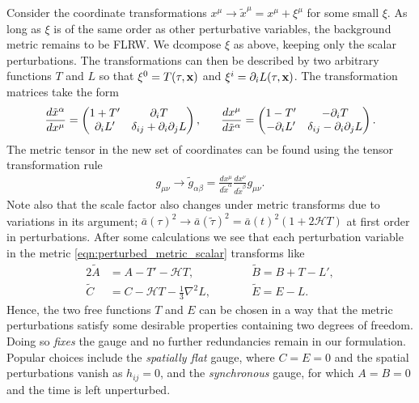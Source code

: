 Consider the coordinate transformations $x^\mu \rightarrow \tilde{x}^\mu = x^\mu + \xi^\mu$ for some small $\xi$. As long as $\xi$ is of the same order as other perturbative variables, the background metric remains to be FLRW. We dcompose $\xi$ as above, keeping only the scalar perturbations. The transformations can then be described by two arbitrary functions $T$ and $L$ so that $\xi^0 = T(\tau,\mathbf{x})$ and $\xi^i = \partial_i L(\tau,\mathbf{x})$. The transformation matrices take the form
\begin{align}
	\frac{d\tilde{x}^\alpha}{dx^\mu} = \begin{pmatrix}
		1 + T' & \partial_i T \\ \partial_i L' & \delta_{ij} + \partial_i \partial_j L
	\end{pmatrix},
	\hspace{0.05\linewidth}
	\frac{dx^\mu}{d\tilde{x}^\alpha} = \begin{pmatrix}
		1 - T' & -\partial_i T \\ -\partial_i L' & \delta_{ij} - \partial_i \partial_j L
	\end{pmatrix}. \label{eqn:gauge_transformation_matrix}
\end{align}
The metric tensor in the new set of coordinates can be found using the tensor transformation rule
\begin{align}
	g_{\mu\nu} \rightarrow \tilde{g}_{\alpha\beta} = \frac{dx^\mu}{d\tilde{x}^\alpha} \frac{dx^\nu}{d\tilde{x}^\beta} g_{\mu\nu}.
\end{align}
Note also that the scale factor also changes under 
metric transforms due to variations in its argument;  $\bar{a}(\tau)^2 \rightarrow \bar{a}(\tilde{\tau})^2 = \bar{a}(t)^2 (1 + 2 \mathcal{H} T)$ at first order in perturbations. After some calculations we see that each perturbation variable in the metric \eqref{eqn:perturbed_metric_scalar} transforms like
\begin{alignat}{2}
	\tilde{A} &= A - T' - \mathcal{H}T, \qquad &&\tilde{B} = B + T - L', \label{eqn:gauge_transform_perturbations_1}\\
	\tilde{C} &= C - \mathcal{H}T - \frac{1}{3}\nabla^2 L, \qquad &&\tilde{E} = E - L. \label{eqn:gauge_transform_perturbations_2}
\end{alignat}
Hence, the two free functions $T$ and $E$ can be chosen in a way that the metric perturbations satisfy some desirable properties containing two degrees of freedom. Doing so \textit{fixes} the gauge and no further redundancies remain in our formulation. Popular choices include the \textit{spatially flat} gauge, where $C=E=0$ and the spatial perturbations vanish as $h_{ij}=0$, and the \textit{synchronous} gauge, for which $A=B=0$ and the time is left unperturbed.

